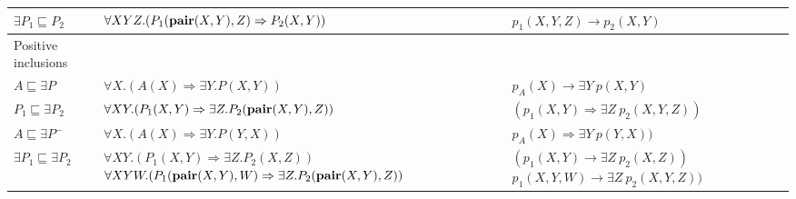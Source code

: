 \begin{longtable}{| p{2cm} | p{8.2cm} | p{5.2cm} |}
	\hline
		$\exists P_1 \sqsubseteq P_2$
		&
		$\forall X Y Z. (P_1(\pair{X,Y},Z) \Rightarrow P_2(X,Y))$
		&
	$p_1(X,Y, Z) \rightarrow p_2 (X,Y)$  
	\\

	\hline
		Positive inclusions & &
	\\
	
	\hline
		$A \sqsubseteq \exists P$		
		&
		$\forall X.(A(X) \Rightarrow \exists Y. P(X,Y)) $
		&
$p_A(X) \rightarrow \exists Y~ p (X,Y)$ 
	\\
	
	\hline	
		$P_1 \sqsubseteq \exists P_2$		
		&
		$\forall X Y .(P_1(X,Y) \Rightarrow \exists Z. P_2(\pair{X,Y},Z)) $
		&
$(p_1(X,Y) \Rightarrow \exists Z~p_2(X,Y,Z)) $
	\\
	
	\hline
		$A \sqsubseteq \exists P^{-}$		
		&
		$\forall X .(A(X) \Rightarrow \exists Y. P(Y,X)) $
		&
$p_A(X) \Rightarrow \exists Y~p(Y,X)) $
	\\
	
	\hline
		$\exists P_1 \sqsubseteq \exists P_2$		
		&
		$\forall X Y. (P_1(X,Y) \Rightarrow \exists Z .P_2(X,Z)) $ \newline
		$\forall X Y W.(P_1(\pair{X,Y},W) \Rightarrow \exists Z. P_2(\pair{X,Y}, Z)) $
		&
$ (p_1(X,Y) \rightarrow \exists Z ~p_2(X,Z)) $ \newline
		$p_1(X,Y,W) \rightarrow \exists Z~p_2(X,Y, Z)) $
	\\
	

\end{longtable}
